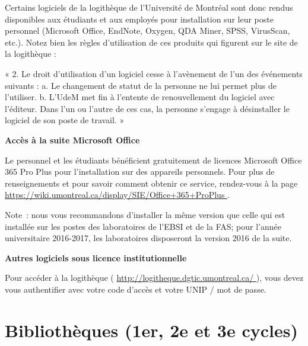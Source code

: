 \documentclass [12 pt]{article}
\begin{document}
            Certains logiciels de la logithèque de l'Université de Montréal sont donc rendus
                disponibles aux étudiants et aux employés pour installation sur leur poste personnel
                (Microsoft Office, EndNote, Oxygen, QDA Miner, SPSS, VirusScan, etc.). Notez bien
                les règles d'utilisation de ces produits qui figurent sur le site de la logithèque
                :
            
                « 2. Le droit d'utilisation d'un logiciel cesse à l'avènement de l'un des
                    événements suivants :
                a. Le changement de statut de la personne ne lui permet plus de l'utiliser.
                b. L'UdeM met fin à l'entente de renouvellement du logiciel avec l'éditeur.
                Dans l'un ou l'autre de ces cas, la personne s'engage à désinstaller le logiciel
                    de son poste de travail. »
            
            
        \textbf{
        Accès à la suite Microsoft Office
        }
    
            Le personnel et les étudiants bénéficient gratuitement de licences Microsoft Office
                365 Pro Plus pour l’installation sur des appareils personnels.
            Pour plus de renseignements et pour savoir comment obtenir ce service, rendez-vous à
                la page 
        \href{
        https://wiki.umontreal.ca/display/SIE/Office+365+ProPlus
        } {
        https://wiki.umontreal.ca/display/SIE/Office+365+ProPlus
        }
    .
            
                Note : nous vous recommandons d’installer la même version que celle qui est
                    installée sur les postes des laboratoires de l’EBSI et de la FAS; pour l’année
                    universitaire 2016-2017, les laboratoires disposeront la version 2016 de la
                    suite.
            
            
        \textbf{
        Autres logiciels sous licence institutionnelle
        }
    
            Pour accéder à la logithèque (
        \href{
        http://logitheque.dgtic.umontreal.ca/
        } {
        http://logitheque.dgtic.umontreal.ca/
        }
    ),
                vous devez vous authentifier avec votre code d'accès et votre UNIP / mot de
                passe.
        
    
    
        \newpage
        \section {
        Bibliothèques (1er, 2e et 3e cycles)
        }
        
\end{document}
